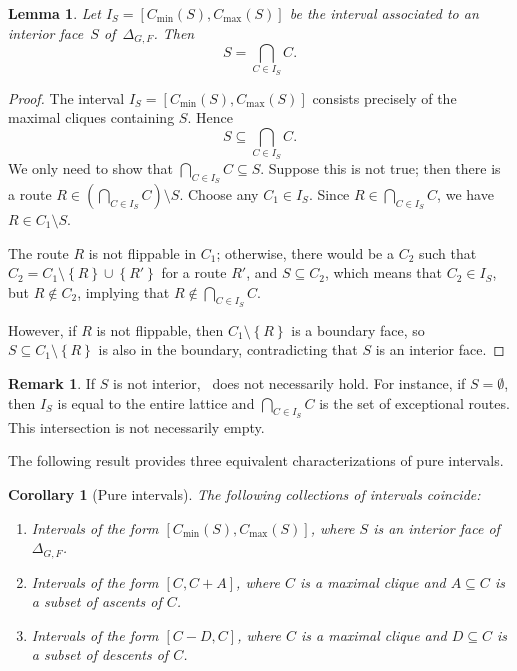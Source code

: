 \documentclass[12pt, reqno]{amsart}
\newcommand{\set}[1]{\left\lbrace#1\right\rbrace}
\theoremstyle{plain}
\newtheorem{lemma}[theorem]{Lemma}
\newtheorem{corollary}[theorem]{Corollary}
\theoremstyle{definition}
\newtheorem{remark}[theorem]{Remark}
\numberwithin{equation}{section}
\begin{document}
\begin{lemma}\label{lemma_interior_faces_equal_intersection}
    Let $I_S=[C_{\min}(S),C_{\max}(S)]$ be the interval associated to an interior face~$S$ of~$\Delta_{G,F}$. Then
    \[
    S=\bigcap_{C\in I_S} C.
    \]
\end{lemma}
\begin{proof}
The interval $I_S=[C_{\min}(S), C_{\max}(S)]$ consists precisely of the maximal cliques containing $S$. Hence
\[
S\subseteq \bigcap_{C\in I_S} C.
\]
We only need to show that $\bigcap_{C\in I_S} C \subseteq S$. Suppose this is not true; then there is a route $R\in (\bigcap_{C\in I_S} C) \setminus S$. Choose any $C_1\in I_S$. Since $R\in\bigcap_{C\in I_S} C$, we have $R\in C_1\setminus S$.

The route $R$ is not flippable in $C_1$; otherwise, there would be a $C_2$ such that $C_2=C_1 \setminus\set{R}\cup\set{R'}$ for a route $R'$, and $S\subseteq C_2$, which means that $C_2\in I_S$, but $R\notin C_2$, implying that $R\notin \bigcap_{C\in I_S} C$.

However, if $R$ is not flippable, then $C_1\setminus\set{R}$ is a boundary face, so $S\subseteq C_1\setminus\set{R}$ is also in the boundary, contradicting that $S$ is an interior face.
\end{proof}

\begin{remark}
    If $S$ is not interior,~ does not necessarily hold. For instance, if $S=\emptyset$, then $I_S$ is equal to the entire lattice and $\bigcap_{C\in I_S} C$ is the set of exceptional routes. This intersection is not necessarily empty.
\end{remark}


The following result provides three equivalent characterizations of pure intervals.

\begin{corollary}[Pure intervals]\label{cor_pureintervals_equivalence}
The following collections of intervals coincide:
\begin{enumerate}
\item Intervals of the form $[C_{\min}(S),C_{\max}(S)]$, where $S$ is an interior face of $\Delta_{G,F}$.
\item Intervals of the form $[C,C+A]$, where $C$ is a maximal clique and $A\subseteq C$ is a subset of ascents of $C$.
\item Intervals of the form $[C-D,C]$, where $C$ is a maximal clique and $D\subseteq C$ is a subset of descents of $C$.
\end{enumerate}
\end{corollary}
\end{document}
